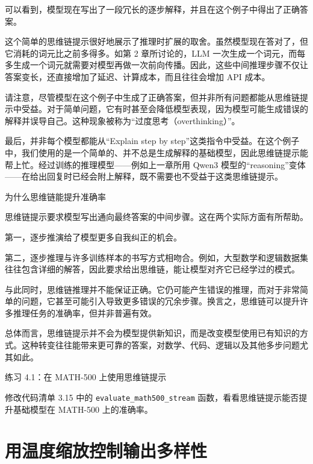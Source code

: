 可以看到，模型现在写出了一段冗长的逐步解释，并且在这个例子中得出了正确答案。

这个简单的思维链提示很好地展示了推理时扩展的取舍。虽然模型现在答对了，但它消耗的词元比之前多得多。如第 2 章所讨论的，LLM 一次生成一个词元，而每多生成一个词元就需要对模型再做一次前向传播。因此，这些中间推理步骤不仅让答案变长，还直接增加了延迟、计算成本，而且往往会增加 API 成本。

请注意，尽管模型在这个例子中生成了正确答案，但并非所有问题都能从思维链提示中受益。对于简单问题，它有时甚至会降低模型表现，因为模型可能生成错误的解释并误导自己。这种现象被称为“过度思考（overthinking）”。

最后，并非每个模型都能从“Explain step by step”这类指令中受益。在这个例子中，我们使用的是一个简单的、并不总是生成解释的基础模型，因此思维链提示能帮上忙。经过训练的推理模型——例如上一章所用 Qwen3 模型的“reasoning”变体——在给出回复时已经会附上解释，既不需要也不受益于这类思维链提示。

\begin{mySidebar}{为什么思维链能提升准确率}

思维链提示要求模型写出通向最终答案的中间步骤。这在两个实际方面有所帮助。

第一，逐步推演给了模型更多自我纠正的机会。

第二，逐步推理与许多训练样本的书写方式相吻合。例如，大型数学和逻辑数据集往往包含详细的解答，因此要求给出思维链，能让模型对齐它已经学过的模式。

与此同时，思维链推理并不能保证正确。它仍可能产生错误的推理，而对于非常简单的问题，它甚至可能引入导致更多错误的冗余步骤。换言之，思维链可以提升许多推理任务的准确率，但并非普遍有效。

总体而言，思维链提示并不会为模型提供新知识，而是改变模型使用已有知识的方式。这种转变往往能带来更可靠的答案，对数学、代码、逻辑以及其他多步问题尤其如此。

\end{mySidebar}

\begin{mySidebar}{练习 4.1：在 MATH-500 上使用思维链提示}

修改代码清单 3.15 中的 \texttt{evaluate\_math500\_stream} 函数，看看思维链提示能否提升基础模型在 MATH-500 上的准确率。

\end{mySidebar}

\section{用温度缩放控制输出多样性}

